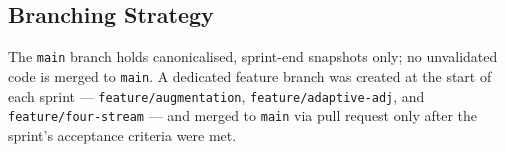 \subsection{Branching Strategy}
\label{sec:branching}

The \texttt{main} branch holds canonicalised, sprint-end snapshots only; no unvalidated code is merged to \texttt{main}. A dedicated feature branch was created at the start of each sprint --- \texttt{feature/augmentation}, \texttt{feature/adaptive-adj}, and \texttt{feature/four-stream} --- and merged to \texttt{main} via pull request only after the sprint's acceptance criteria were met.
